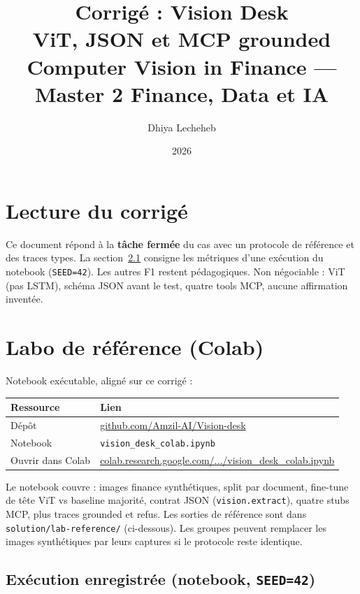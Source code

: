 \documentclass[11pt,a4paper]{article}
\title{%
  \textbf{Corrigé : Vision Desk}\\[0.35em]
  \large ViT, JSON et MCP grounded\\[0.5em]
  \normalsize Computer Vision in Finance --- Master 2 Finance, Data et IA
}
\author{Dhiya Lecheheb}
\date{2026}
\begin{document}
\maketitle
\thispagestyle{empty}

\section{Lecture du corrigé}

Ce document répond à la \textbf{tâche fermée} du cas avec un protocole de
référence et des traces types. La section~\ref{sec:lab-run} consigne les métriques
d'une exécution du notebook (\texttt{SEED=42}). Les autres F1 restent pédagogiques.
Non négociable : ViT (pas LSTM), schéma JSON avant le test, quatre tools MCP,
aucune affirmation inventée.

\section{Labo de référence (Colab)}

Notebook exécutable, aligné sur ce corrigé :

\begin{center}
\renewcommand{\arraystretch}{1.15}
\begin{tabular}{@{}p{3.2cm}p{11.4cm}@{}}
\toprule
\textbf{Ressource} & \textbf{Lien} \\
\midrule
Dépôt & \href{https://github.com/Amzil-AI/Vision-desk}{github.com/Amzil-AI/Vision-desk} \\
Notebook & \texttt{vision\_desk\_colab.ipynb} \\
Ouvrir dans Colab & \href{https://colab.research.google.com/github/Amzil-AI/Vision-desk/blob/main/vision_desk_colab.ipynb}{colab.research.google.com/.../vision\_desk\_colab.ipynb} \\
\bottomrule
\end{tabular}
\end{center}

Le notebook couvre : images finance synthétiques, split par document, fine-tune
de tête ViT vs baseline majorité, contrat JSON (\texttt{vision.extract}), quatre
stubs MCP, plus traces grounded et refus. Les sorties de référence sont dans
\texttt{solution/lab-reference/} (ci-dessous). Les groupes peuvent remplacer les images
synthétiques par leurs captures si le protocole reste identique.

\subsection{Exécution enregistrée (notebook, \texttt{SEED=42})}
\label{sec:lab-run}
\end{document}

